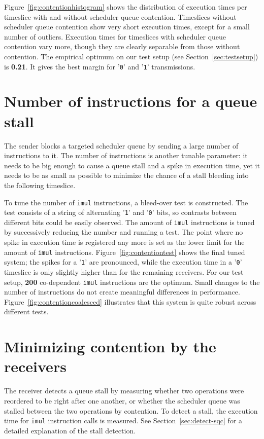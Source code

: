 \documentclass[11pt,
  titlepage=false,
  parskip=half,      %
]{scrreprt}
\begin{document}
Figure~\ref{fig:contentionhistogram} shows the distribution of execution times per timeslice with and without scheduler queue contention.
Timeslices without scheduler queue contention show very short execution times, except for a small number of outliers.
Execution times for timeslices with scheduler queue contention vary more, though they are clearly separable from those without contention.
The empirical optimum on our test setup (see Section~\ref{sec:testsetup}) is \textbf{0.21}.
It gives the best margin for '\texttt{0}' and '\texttt{1}' transmissions.


\section{Number of instructions for a queue stall}
The sender blocks a targeted scheduler queue by sending a large number of instructions to it.
The number of instructions is another tunable parameter:
it needs to be big enough to cause a queue stall and a spike in execution time,
yet it needs to be as small as possible to minimize the chance of a stall bleeding into the following timeslice.

To tune the number of \texttt{imul} instructions, a bleed-over test is constructed.
The test consists of a string of alternating '\texttt{1}' and '\texttt{0}' bits, so contrasts between different bits could be easily observed.
The amount of \texttt{imul} instructions is tuned by successively reducing the number and running a test.
The point where no spike in execution time is registered any more is set as the lower limit for the amount of \texttt{imul} instructions.
Figure~\ref{fig:contentiontest} shows the final tuned system;
the spikes for a '\texttt{1}' are pronounced, while the execution time in a '\texttt{0}' timeslice is only slightly higher than for the remaining receivers.
For our test setup, \textbf{200} co-dependent \texttt{imul} instructions are the optimum.
Small changes to the number of instructions do not create meaningful differences in performance.
Figure~\ref{fig:contentioncoalesced} illustrates that this system is quite robust across different tests.

\section{Minimizing contention by the receivers}
\label{sec:reducecontention}
The receiver detects a queue stall by measuring whether two operations were reordered to be right after one another,
or whether the scheduler queue was stalled between the two operations by contention.
To detect a stall, the execution time for \texttt{imul} instruction calls is measured.
See Section~\ref{sec:detect-sqc} for a detailed explanation of the stall detection.
\end{document}
